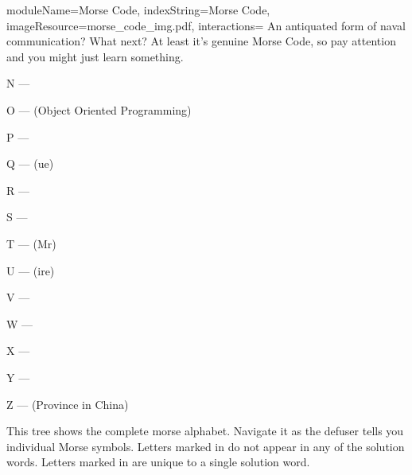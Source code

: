 \documentclass{../../ktane-mod}
\begin{document}
\begin{module}{
  moduleName=Morse Code,
  indexString=Morse Code,
  imageResource=morse_code_img.pdf,
  interactions=\keysymbol
}{
  An antiquated form of naval communication?
  What next?
  At least it's genuine Morse Code, so pay attention and you might just learn something.
}
\begin{multicols}{3}
    N --- \LIGHTBLUE[N]\LIGHTRED[o]

    O --- \LIGHTBLUE[O]\LIGHTBLUE[O]\LIGHTBLUE[P] (Object Oriented Programming)

    P --- \LIGHTRED[a]\LIGHTBLUE[p]\LIGHTBLUE[p]\LIGHTRED[s]

    Q --- \LIGHTBLUE[p]\LIGHTBLUE[l]\LIGHTRED[a]\LIGHTBLUE[q](ue)

    R --- \LIGHTRED[r]\LIGHTBLUE[y]\LIGHTRED[e]

    S --- \LIGHTRED[s]\LIGHTRED[a]\LIGHTRED[x]

    T --- (Mr) \LIGHTBLUE[T]

    U --- \LIGHTRED[u]\LIGHTRED[m]\LIGHTBLUE[p](ire)

    V --- \LIGHTRED[v]\LIGHTRED[e]\LIGHTRED[a]\LIGHTBLUE[l]

    W --- \LIGHTRED[w]\LIGHTBLUE[h]\LIGHTBLUE[y]

    X --- \LIGHTBLUE[f]\LIGHTRED[o]\LIGHTRED[x]\LIGHTBLUE[y]

    Y --- \LIGHTBLUE[y]\LIGHTRED[e]\LIGHTBLUE[l]\LIGHTBLUE[l]

    Z --- \LIGHTBLUE[Z]\LIGHTBLUE[h]\LIGHTRED[o]\LIGHTRED[u] (Province in China)
  \end{multicols}

  \clearpage


  \newcommand{\mdot}{{\Large •}}
  \newcommand{\mdash}{{\Large -}}

  This tree shows the complete morse alphabet.
  Navigate it as the defuser tells you individual Morse symbols.
  Letters marked in \RED[red] do not appear in any of the solution words.
  Letters marked in \LIGHTGREEN[green] are unique to a single solution word.

  \begin{bulletlist}
  \end{bulletlist}


\end{module}
\end{document}
